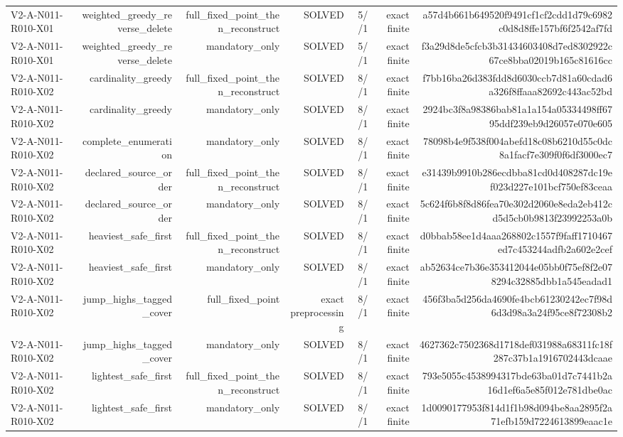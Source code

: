 {\begin{longtable}{lrrrrrr}
V2-A-N011-R010-X01 & weighted\_greedy\_reverse\_delete & full\_fixed\_point\_then\_reconstruct & SOLVED & 5//1 & exact finite & a57d4b661b649520f9491cf1cf2cdd1d79c6982c0d8d8ffe157bf6f2542af7fd \\
V2-A-N011-R010-X01 & weighted\_greedy\_reverse\_delete & mandatory\_only & SOLVED & 5//1 & exact finite & f3a29d8de5cfcb3b31434603408d7ed8302922c67ce8bba02019b165c81616cc \\
V2-A-N011-R010-X02 & cardinality\_greedy & full\_fixed\_point\_then\_reconstruct & SOLVED & 8//1 & exact finite & f7bb16ba26d383fdd8d6030ccb7d81a60cdad6a326f8ffaaa82692c443ac52bd \\
V2-A-N011-R010-X02 & cardinality\_greedy & mandatory\_only & SOLVED & 8//1 & exact finite & 2924bc3f8a98386bab81a1a154a05334498ff6795ddf239eb9d26057e070e605 \\
V2-A-N011-R010-X02 & complete\_enumeration & mandatory\_only & SOLVED & 8//1 & exact finite & 78098b4e9f538f004abefd18c08b6210d55c0dc8a1facf7e309f0f6df3000ec7 \\
V2-A-N011-R010-X02 & declared\_source\_order & full\_fixed\_point\_then\_reconstruct & SOLVED & 8//1 & exact finite & e31439b9910b286ecdbba81cd0d408287dc19ef023d227e101bcf750ef83ceaa \\
V2-A-N011-R010-X02 & declared\_source\_order & mandatory\_only & SOLVED & 8//1 & exact finite & 5c624f6b8f8d86fea70e302d2060e8eda2eb412cd5d5cb0b9813f23992253a0b \\
V2-A-N011-R010-X02 & heaviest\_safe\_first & full\_fixed\_point\_then\_reconstruct & SOLVED & 8//1 & exact finite & d0bbab58ee1d4aaa268802c1557f9faff1710467ed7c453244adfb2a602e2cef \\
V2-A-N011-R010-X02 & heaviest\_safe\_first & mandatory\_only & SOLVED & 8//1 & exact finite & ab52634ce7b36e353412044e05bb0f75ef8f2e078294c32885dbb1a545eadad1 \\
V2-A-N011-R010-X02 & jump\_highs\_tagged\_cover & full\_fixed\_point & exact preprocessing & 8//1 & exact finite & 456f3ba5d256da4690fe4bcb61230242ec7f98d6d3d98a3a24f95ce8f72308b2 \\
V2-A-N011-R010-X02 & jump\_highs\_tagged\_cover & mandatory\_only & SOLVED & 8//1 & exact finite & 4627362c7502368d1718def031988a68311fc18f287c37b1a1916702443dcaae \\
V2-A-N011-R010-X02 & lightest\_safe\_first & full\_fixed\_point\_then\_reconstruct & SOLVED & 8//1 & exact finite & 793e5055c4538994317bde63ba01d7c7441b2a16d1ef6a5e85f012e781dbe0ac \\
V2-A-N011-R010-X02 & lightest\_safe\_first & mandatory\_only & SOLVED & 8//1 & exact finite & 1d0090177953f814d1f1b98d094be8aa2895f2a71efb159d7224613899eaac1e \\

\end{longtable}}

